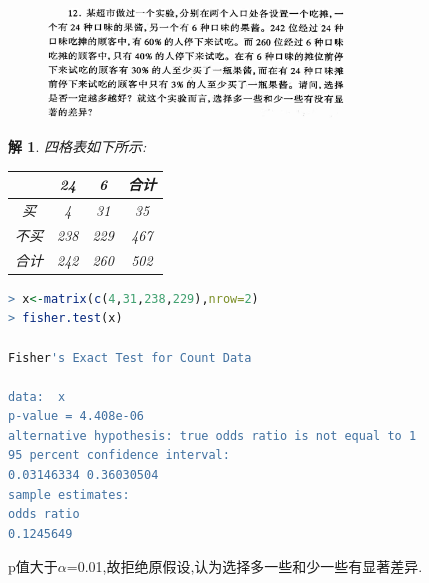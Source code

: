 \documentclass[11pt,a4paper]{ctexart}
\newtheorem*{solution}{解}
\begin{document}
\begin{figure}[H]
	\includegraphics[width=0.7\textwidth]{screenshot004}
\end{figure}
\begin{solution}
	四格表如下所示:
	\begin{table}[!htbp]   %
		\centering
		\begin{tabular}{cccc}
			\toprule[1.5pt]
			& 24  & 6 & 合计\\
			\midrule[1pt]
			买& 4 & 31 & 35\\
			不买 & 238 & 229 & 467\\
			\midrule[1pt]
			合计 & 242 & 260 & 502\\
			\bottomrule[1.5pt]
		\end{tabular}
	\end{table}
\end{solution}
\begin{lstlisting}[language=r]
> x<-matrix(c(4,31,238,229),nrow=2)
> fisher.test(x)

Fisher's Exact Test for Count Data

data:  x
p-value = 4.408e-06
alternative hypothesis: true odds ratio is not equal to 1
95 percent confidence interval:
0.03146334 0.36030504
sample estimates:
odds ratio 
0.1245649 
\end{lstlisting}
p值大于$ \alpha $=0.01,故拒绝原假设,认为选择多一些和少一些有显著差异.\\
\end{document}
